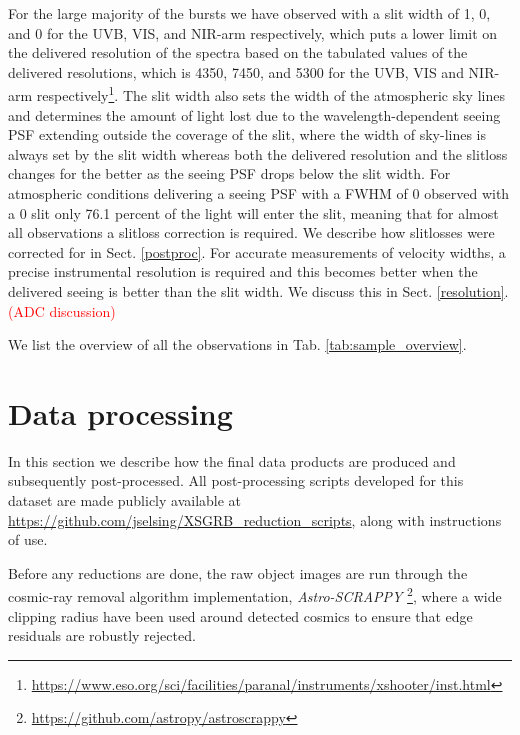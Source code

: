 \documentclass{aa}    %
\newcommand\todo[1]{\textcolor{red}{(#1)}}
\begin{document}
For the large majority of the bursts we have observed with a slit width of
1, 0, and 0 for the UVB, VIS, and NIR-arm respectively, which
puts a lower limit on the delivered resolution of the spectra based on the
tabulated values of the delivered resolutions, which is 4350, 7450, and 5300 for
the UVB, VIS and NIR-arm respectively\footnote{\url{https://www.eso.org/sci/facilities/paranal/instruments/xshooter/inst.html}}.
The slit width also sets the width of the atmospheric sky lines and determines
the amount of light lost due to the wavelength-dependent seeing PSF extending
outside the coverage of the slit, where the width of sky-lines is always set by
the slit width whereas both the delivered resolution and the slitloss changes
for the better as the seeing PSF drops below the slit width.
For atmospheric conditions delivering a seeing PSF with a FWHM of 0
observed with a 0 slit only 76.1 percent of the light will enter the slit,
meaning that for almost all observations a slitloss correction is required. We
describe how slitlosses were corrected for in Sect. \ref{postproc}.
For accurate measurements of velocity widths, a precise instrumental resolution
is required and this becomes better when the delivered seeing is better than the
slit width. We discuss this in Sect. \ref{resolution}.
\\
\todo{ADC discussion}


We list the overview of all the observations in Tab. \ref{tab:sample_overview}.


\section{Data processing}

In this section we describe how the final data products are produced and
subsequently post-processed. All post-processing scripts developed for this
dataset are made publicly available at
\url{https://github.com/jselsing/XSGRB_reduction_scripts}, along with
instructions of use.

Before any reductions are done, the raw object images are run through the
cosmic-ray removal algorithm \citep{VanDokkum2001} implementation,
\textit{Astro-SCRAPPY} \footnote{\url{https://github.com/astropy/astroscrappy}},
where a wide clipping radius have been used around detected cosmics to ensure that edge residuals are
robustly rejected. 
\end{document}
